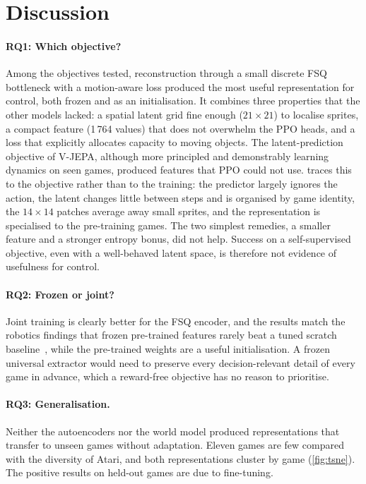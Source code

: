 \documentclass[runningheads]{llncs}
\begin{document}
\section{Discussion}
\label{sec:discussion}

\paragraph{RQ1: Which objective?}
Among the objectives tested, reconstruction through a small discrete FSQ bottleneck with a
motion-aware loss produced the most useful representation for control, both frozen and
as an initialisation. It combines three properties that the other models lacked: a
spatial latent grid fine enough ($21\times21$) to localise sprites, a compact feature
(1\,764 values) that does not overwhelm the PPO heads, and a loss that explicitly allocates
capacity to moving objects. The latent-prediction objective of V-JEPA, although more
principled and demonstrably learning dynamics on seen games, produced features that PPO
could not use.  traces this to the objective rather than to the training:
the predictor largely ignores the action, the latent changes little between steps and is
organised by game identity, the $14\times14$ patches average away small sprites, and the
representation is specialised to the pre-training games. The two simplest remedies, a
smaller feature and a stronger entropy bonus, did not help. Success on a self-supervised
objective, even with a well-behaved latent space, is therefore not evidence of usefulness
for control.

\paragraph{RQ2: Frozen or joint?}
Joint training is clearly better for the FSQ encoder, and the results match the robotics
findings that frozen pre-trained features rarely beat a tuned scratch
baseline~\cite{hansen2022pretrained}, while the pre-trained weights are a useful
initialisation. A frozen universal extractor would need to preserve every
decision-relevant detail of every game in advance, which a reward-free objective has no
reason to prioritise.

\paragraph{RQ3: Generalisation.}
Neither the autoencoders nor the world model produced representations that transfer to
unseen games without adaptation. Eleven games are few compared with the diversity of
Atari, and both representations cluster by game (\cref{fig:tsne}). The positive results on
held-out games are due to fine-tuning.
\end{document}
